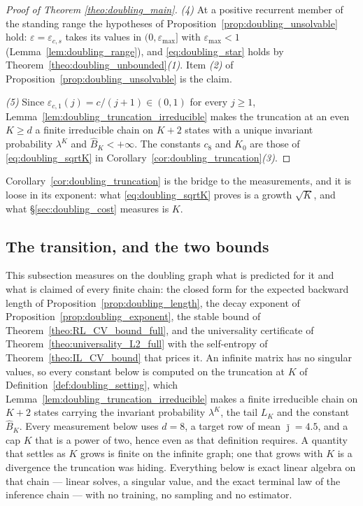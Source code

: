 \begin{proof}[Proof of Theorem \ref{theo:doubling_main}]
\emph{(4)} At a positive recurrent member of the standing range the hypotheses of
Proposition~\ref{prop:doubling_unsolvable} hold: $\varepsilon=\varepsilon_{c,s}$ takes its
values in $(0,\varepsilon_{\max}]$ with $\varepsilon_{\max}<1$
(Lemma~\ref{lem:doubling_range}), and \eqref{eq:doubling_star} holds by
Theorem~\ref{theo:doubling_unbounded}\emph{(1)}. Item \emph{(2)} of
Proposition~\ref{prop:doubling_unsolvable} is the claim.

\emph{(5)} Since $\varepsilon_{c,1}(j)=c/(j+1)\in(0,1)$ for every $j\geq1$,
Lemma~\ref{lem:doubling_truncation_irreducible} makes the truncation at an even $K\geq d$ a
finite irreducible chain on $K+2$ states with a unique invariant probability $\lambda^K$ and
$\widehat B_K<+\infty$. The constants $c_8$ and $K_0$ are those of \eqref{eq:doubling_sqrtK} in
Corollary~\ref{cor:doubling_truncation}\emph{(3)}.
\end{proof}

Corollary~\ref{cor:doubling_truncation} is the bridge to the measurements, and it is loose in
its exponent: what \eqref{eq:doubling_sqrtK} proves is a growth $\sqrt K$, and what
\S\ref{sec:doubling_cost} measures is $K$.

\subsection{The transition, and the two bounds}\label{sec:doubling_measured}

This subsection measures on the doubling graph what is predicted for it and what is claimed
of every finite chain: the closed form for the expected backward length of
Proposition~\ref{prop:doubling_length}, the decay exponent of
Proposition~\ref{prop:doubling_exponent}, the stable bound of
Theorem~\ref{theo:RL_CV_bound_full}, and the universality certificate of
Theorem~\ref{theo:universality_L2_full} with the self-entropy of
Theorem~\ref{theo:IL_CV_bound} that prices it. An infinite matrix has no singular values, so
every constant below is computed on the truncation at $K$ of
Definition~\ref{def:doubling_setting}, which
Lemma~\ref{lem:doubling_truncation_irreducible} makes a finite irreducible chain on $K+2$
states carrying the invariant probability $\lambda^K$, the tail $L_K$ and the constant
$\widehat B_K$. Every measurement below uses $d=8$, a target row of mean $\bar\jmath=4.5$,
and a cap $K$ that is a power of two, hence even as that definition requires. A quantity that
settles as $K$ grows is
finite on the infinite graph; one that grows with $K$ is a divergence the truncation was
hiding. Everything below is exact linear algebra on that chain --- linear solves, a singular
value, and the exact terminal law of the inference chain --- with no training, no sampling and
no estimator.

